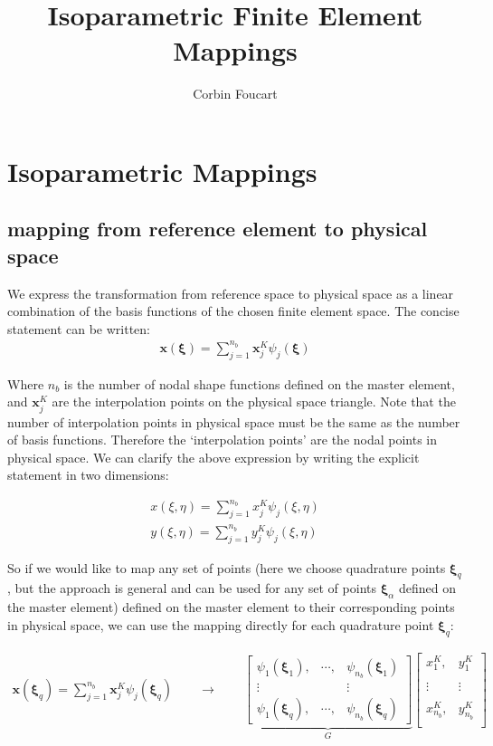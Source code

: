 \documentclass[10pt]{article}
\title{Isoparametric Finite Element Mappings}
\author{Corbin Foucart}
\date{}
\begin{document}
\maketitle

\section{Isoparametric Mappings}

\subsection{mapping from reference element to physical space}
We express the transformation from reference space to physical space as a linear combination of the
basis functions of the chosen finite element space. The concise statement can be written:
\begin{align}
  \bm{x}(\bm{\xi}) = \sum_{j=1}^{n_b} \bm{x}_j^K \psi_j(\bm{\xi})
  \label{eq:isotrans}
\end{align}

Where $n_b$ is the number of nodal shape functions defined on the master element, and $\bm{x}_j^K$
are the interpolation points on the physical space triangle. Note that the number of interpolation
points in physical space must be the same as the number of basis functions. Therefore the
`interpolation points' are the nodal points in physical space. We can clarify the above expression
by writing the explicit statement in two dimensions:

\begin{align}
  x(\xi, \eta) = \sum_{j=1}^{n_b} x_j^K \psi_j(\xi, \eta) \\
  y(\xi, \eta) = \sum_{j=1}^{n_b} y_j^K \psi_j(\xi, \eta)
\end{align}

So if we would like to map any set of points (here we choose quadrature points $\bm{\xi}_q$, but the
approach is general and can be used for any set of points $\bm{\xi}_\alpha$ defined on the master
element) defined on the master element to their corresponding points in physical space, we can use
the mapping directly for each quadrature point $\bm{\xi}_q$:

\begin{align}
  \bm{x}(\bm{\xi}_q) = \sum_{j=1}^{n_b} \bm{x}_j^K \psi_j(\bm{\xi}_q) 
  \qquad\rightarrow\qquad
  \underbrace{
  \begin{bmatrix}
    \psi_1(\bm{\xi}_{1}), & \cdots, & \psi_{n_b}(\bm{\xi}_1) \\
    \vdots & & \vdots  \\
    \psi_1(\bm{\xi}_{q}), & \cdots, & \psi_{n_b}(\bm{\xi}_q)
  \end{bmatrix}}_{G}
  \begin{bmatrix}
     x_1^K, & y_1^K\\
     & \\
     \vdots & \vdots  \\
     & \\
     x_{n_b}^K, & y_{n_b}^K\\
   \end{bmatrix}
\end{align}
\end{document}
